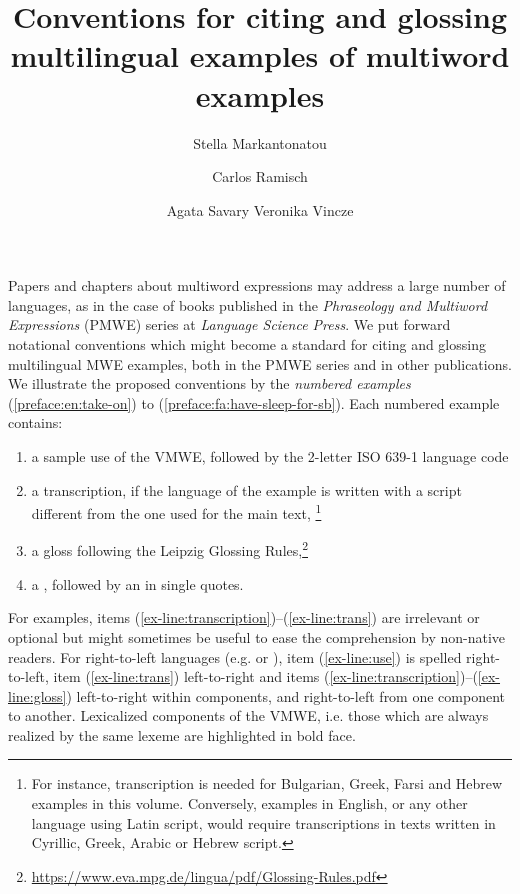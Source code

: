 \documentclass[output=paper
,modfonts
,nonflat]{langsci/langscibook}
\title{Conventions for citing and glossing multilingual examples of multiword examples} %
\author{
 Stella Markantonatou\affiliation{Institute for Language and Speech Processing, Athena RIC, Greece}\and 
 Carlos Ramisch\affiliation{Aix Marseille Univ, Université de Toulon, CNRS, LIS, Marseille, France}\and
 Agata Savary\affiliation{University of Tours, LIFAT, France}\lastand
 Veronika Vincze\affiliation{University of Szeged, Hungary}
}
\begin{document}
\maketitle
Papers and chapters about multiword expressions may address a large number of languages, as in the case of books published in the \textit{Phraseology and Multiword Expressions} (PMWE) series at \textit{Language Science Press}. We put forward notational conventions which might become a standard for citing and glossing multilingual MWE examples, both in the PMWE series and in other publications.
We illustrate the proposed conventions by the \emph{numbered examples}  (\ref{preface:en:take-on}) to (\ref{preface:fa:have-sleep-for-sb}). Each numbered example contains:
\begin{enumerate}%
\item\label{ex-line:use} a sample use of the VMWE, followed by the 2-letter ISO 639-1 language code %

\item\label{ex-line:transcription} a transcription, if the language of the example is written with a script different from the one used for the main text,
\footnote{For instance, transcription is needed for Bulgarian, Greek, Farsi and Hebrew examples in this volume. Conversely, examples in English, or any other language using Latin script, would require transcriptions in texts written in Cyrillic, Greek, Arabic or Hebrew script.}

\item\label{ex-line:gloss} a gloss following the Leipzig Glossing Rules,\footnote{\url{https://www.eva.mpg.de/lingua/pdf/Glossing-Rules.pdf}} 

\item\label{ex-line:trans} a , followed by an  in single quotes. 
\end{enumerate}

For  examples, items (\ref{ex-line:transcription})--(\ref{ex-line:trans}) are irrelevant or optional but  might sometimes be useful to ease the comprehension by non-native readers. For right-to-left languages (e.g.  or ), item (\ref{ex-line:use}) is spelled right-to-left, item (\ref{ex-line:trans}) left-to-right and items (\ref{ex-line:transcription})--(\ref{ex-line:gloss}) left-to-right within components, and right-to-left from one component to another. 
Lexicalized components of the VMWE, i.e. those which are always realized by the same lexeme are highlighted in bold face. 
\end{document}
